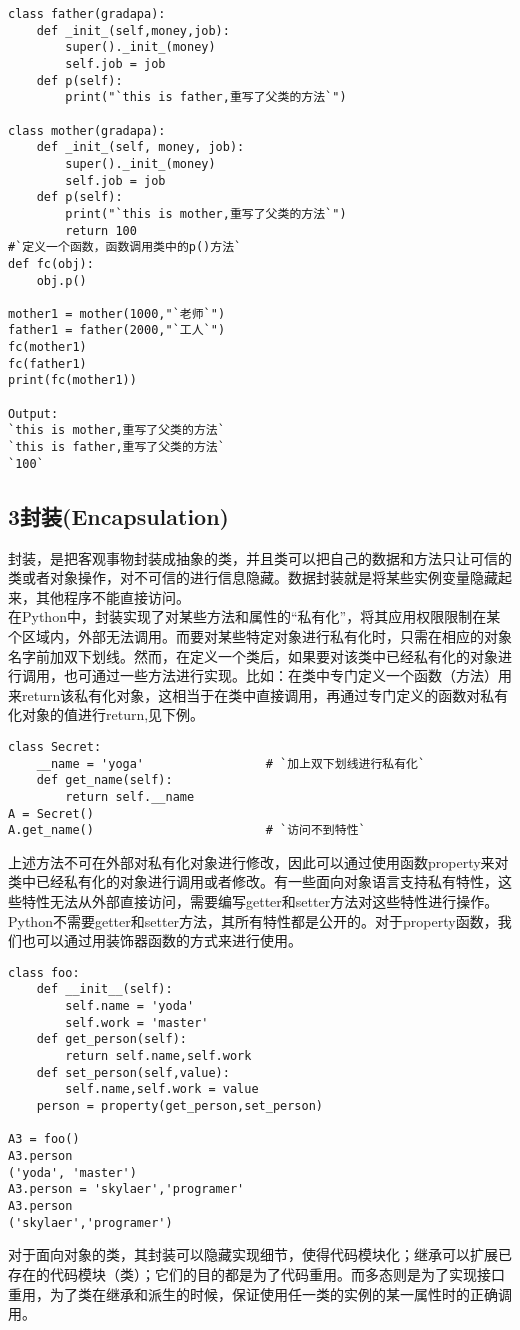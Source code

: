 \documentclass[UTF8]{ctexart}
\begin{document}
\begin{flushleft}
\begin{lstlisting}
class father(gradapa):
    def _init_(self,money,job):
        super()._init_(money)
        self.job = job
    def p(self):
        print("`this is father,重写了父类的方法`")

class mother(gradapa):
    def _init_(self, money, job):
        super()._init_(money)
        self.job = job
    def p(self):
        print("`this is mother,重写了父类的方法`")
        return 100
#`定义一个函数，函数调用类中的p()方法`
def fc(obj):    
    obj.p()

mother1 = mother(1000,"`老师`")
father1 = father(2000,"`工人`")
fc(mother1)
fc(father1)
print(fc(mother1))

Output:
`this is mother,重写了父类的方法`
`this is father,重写了父类的方法`
`100`
\end{lstlisting}

\subsection*{3\;封装(Encapsulation)}
\qquad 封装，是把客观事物封装成抽象的类，并且类可以把自己的数据和方法只让可信的类或者对象操作，对不可信的进行信息隐藏。数据封装就是将某些实例变量隐藏起来，其他程序不能直接访问。\\
\qquad 在Python中，封装实现了对某些方法和属性的“私有化”，将其应用权限限制在某个区域内，外部无法调用。而要对某些特定对象进行私有化时，只需在相应的对象名字前加双下划线。然而，在定义一个类后，如果要对该类中已经私有化的对象进行调用，也可通过一些方法进行实现。比如：在类中专门定义一个函数（方法）用来return该私有化对象，这相当于在类中直接调用，再通过专门定义的函数对私有化对象的值进行return,见下例。\\
\begin{lstlisting}
class Secret:
    __name = 'yoga'                 # `加上双下划线进行私有化`  
    def get_name(self):      
        return self.__name
A = Secret()
A.get_name()                        # `访问不到特性`
\end{lstlisting}
\qquad 上述方法不可在外部对私有化对象进行修改，因此可以通过使用函数property来对类中已经私有化的对象进行调用或者修改。有一些面向对象语言支持私有特性，这些特性无法从外部直接访问，需要编写getter和setter方法对这些特性进行操作。Python不需要getter和setter方法，其所有特性都是公开的。对于property函数，我们也可以通过用装饰器函数的方式来进行使用。
\begin{lstlisting}
class foo:
    def __init__(self):
        self.name = 'yoda'
        self.work = 'master'
    def get_person(self):
        return self.name,self.work
    def set_person(self,value):
        self.name,self.work = value
    person = property(get_person,set_person)

A3 = foo()
A3.person
('yoda', 'master')
A3.person = 'skylaer','programer'
A3.person
('skylaer','programer')
\end{lstlisting}
\qquad 对于面向对象的类，其封装可以隐藏实现细节，使得代码模块化；继承可以扩展已存在的代码模块（类）；它们的目的都是为了代码重用。而多态则是为了实现接口重用，为了类在继承和派生的时候，保证使用任一类的实例的某一属性时的正确调用。


\end{flushleft}
\end{document}
